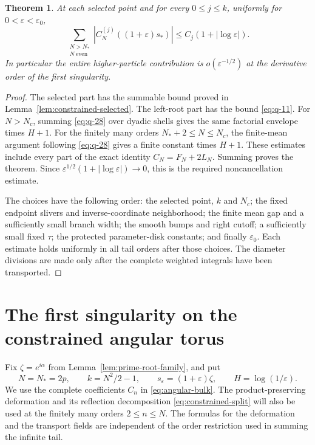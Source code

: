 \documentclass[11pt]{article}
\numberwithin{equation}{section}
\newtheorem{theorem}{Theorem}[section]
\theoremstyle{remark}\newtheorem{remark}[theorem]{Remark}
\begin{document}
\begin{theorem}\label{thm:constrained-tail}
At each selected point and for every $0\le j\le k$, uniformly
for $0<\varepsilon<\varepsilon_0$,
\begin{equation}\label{eq:logarithmic-absolute-tail}
 \sum_{\substack{N>N_*\\N\ \mathrm{even}}}
    |C_N^{(j)}((1+\varepsilon)s_*)|
       \le C_j(1+|\log\varepsilon|).
\end{equation}
In particular the entire higher-particle contribution is
$o(\varepsilon^{-1/2})$ at the derivative order of the first
singularity.
\end{theorem}
\begin{proof}
The selected part has the summable bound proved in
Lemma~\ref{lem:constrained-selected}. The left-root part has
the bound \eqref{eq:q-11}. For $N>N_c$, summing
\eqref{eq:q-28} over dyadic shells gives the same factorial
envelope times $H+1$. For the finitely many orders
$N_*+2\le N\le N_c$, the finite-mean argument following
\eqref{eq:q-28} gives a finite constant times $H+1$.
These estimates include every part of the exact identity
$C_N=F_N+2L_N$. Summing proves the theorem.
Since $\varepsilon^{1/2}(1+|\log\varepsilon|)\to0$, this is
the required noncancellation estimate.

The choices have the following order: the selected point,
$k$ and $N_c$; the fixed endpoint slivers and inverse-coordinate
neighborhood; the finite mean gap and a sufficiently small
branch width; the smooth bumps and right cutoff; a sufficiently
small fixed $\tau$; the protected parameter-disk constants;
and finally $\varepsilon_0$. Each estimate holds uniformly in
all tail orders after those choices. The diameter divisions
are made only after the complete weighted integrals have
been transported.
\end{proof}

\section{The first singularity on the constrained angular torus}
\label{sec:first-single}

Fix $\zeta=e^{i\alpha}$ from Lemma~\ref{lem:prime-root-family}, and put
\[
 N=N_*=2p,\qquad k=N^2/2-1,\qquad
 s_\varepsilon=(1+\varepsilon)\zeta,
 \qquad H=\log(1/\varepsilon).
\]
We use the complete coefficients $C_n$ in \eqref{eq:angular-bulk}.
The product-preserving deformation and its reflection decomposition
\eqref{eq:constrained-split} will also be used at the finitely many
orders $2\le n\le N$.  The formulas for the deformation and the
transport fields are independent of the order restriction used in
summing the infinite tail.
\end{document}
